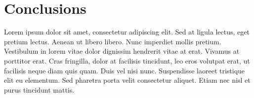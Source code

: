 \documentclass{article}
\begin{document}
\section{Conclusions}
\label{sec:conclusions}

Lorem ipsum dolor sit amet, consectetur adipiscing elit. Sed at ligula lectus,
eget pretium lectus. Aenean ut libero libero. Nunc imperdiet mollis pretium.
Vestibulum in lorem vitae dolor dignissim hendrerit vitae at erat. Vivamus at
porttitor erat. Cras fringilla, dolor at facilisis tincidunt, leo eros volutpat
erat, ut facilisis neque diam quis quam. Duis vel nisi nunc. Suspendisse
laoreet tristique elit eu elementum. Sed pharetra porta velit consectetur
aliquet. Etiam nec nisl et purus tincidunt mattis. 



\end{document}
